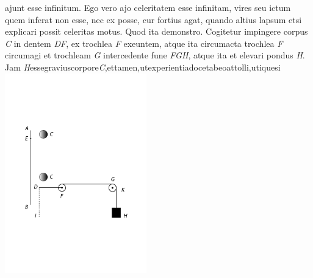 {} ajunt esse infinitum. Ego vero ajo celeritatem\protect{} esse infinitam, vires\protect{} seu ictum\protect{} quem inferat non esse, nec ex  posse, cur  fortius agat, quando altius lapsum etsi explicari possit celeritas motus. Quod ita demonstro. Cogitetur impingere corpus \textit{C} in dentem\protect{} \textit{DF}, ex trochlea\protect{} \textit{F} exeuntem, atque ita circumacta trochlea\protect{} \textit{F} circumagi et trochleam\protect{} \textit{G} intercedente fune\protect{} \textit{FGH}, atque ita et elevari pondus\protect{} \textit{H}. Jam \hfill \textit{H}\hfill esse\hfill gravius\hfill corpore\hfill \textit{C},\hfill et\hfill tamen,\hfill ut\hfill experientia\hfill docet\hfill ab\hfill eo\hfill attolli,\hfill utique\hfill si
\pend
\newpage
\pstart
\centering \includegraphics[trim = 0mm -3mm 0mm 0mm, clip, width=0.46\textwidth]{images/lh03705_008-d1.pdf}\\
